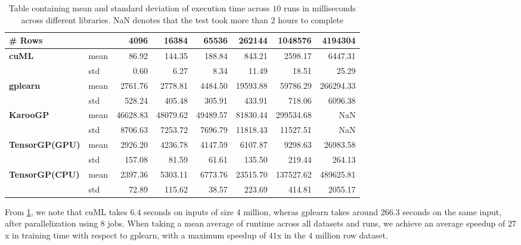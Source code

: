 \begin{table}[htbp]
  \caption{Table containing mean and standard deviation of execution time across $10$ runs in milliseconds across different libraries. NaN denotes that the test took more than $2$ hours to complete}
  \begin{adjustbox}{width=\columnwidth,center}
    \begin{tabular}{llrrrrrr}
      \toprule
      \textbf{\# Rows} & {} &  4096 & 16384 & 65536 & 262144 & 1048576 & 4194304 \\
      \midrule
      \textbf{cuML} & mean &    86.92 &   144.35 &   188.84 &    843.21 &    2598.17 &    6447.31 \\
      & std &     0.60 &     6.27 &     8.34 &     11.49 &      18.51 &      25.29 \\
      \midrule
      \textbf{gplearn} & mean &  2761.76 &  2778.81 &  4484.50 &  19593.88 &   59786.29 &  266294.33 \\
      & std &   528.24 &   405.48 &   305.91 &    433.91 &     718.06 &    6096.38 \\
      \midrule
      \textbf{KarooGP} & mean & 46628.83 & 48079.62 & 49489.57 &  81830.44 &  299534.68 &        NaN \\
      & std &  8706.63 &  7253.72 &  7696.79 &  11818.43 &   11527.51 &        NaN \\
      \midrule
      \textbf{TensorGP(GPU)} & mean &  2926.20 &  4236.78 &  4147.59 &   6107.87 &    9298.63 &   26983.58 \\
      & std &   157.08 &    81.59 &    61.61 &    135.50 &     219.44 &     264.13 \\
      \midrule
      \textbf{TensorGP(CPU)} & mean &  2397.36 &  5303.11 &  6773.76 &  23515.70 &  137527.62 &  489625.81 \\
      & std &    72.89 &   115.62 &    38.57 &    223.69 &     414.81 &    2055.17 \\
      \bottomrule
      \end{tabular}      
    \label{tab:execavgs}
  \end{adjustbox}
\end{table}

From \cref*{tab:execavgs}, we note that cuML takes $6.4$ seconds on inputs of size $4$ million, wheras gplearn takes around $266.3$ seconds on the same input, after parallelization using $8$ jobs. When taking a mean average of runtime across all datasets and runs, we achieve an average speedup of $27$x in training time with respect to gplearn, with a maximum speedup of $41$x in the $4$ million row dataset.

